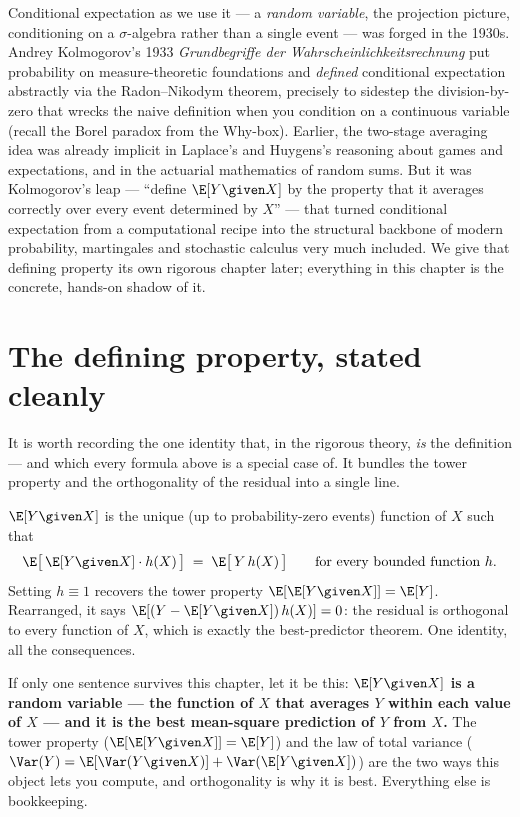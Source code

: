 \begin{historybox}
Conditional expectation as we use it --- a \emph{random variable}, the projection picture, conditioning
on a $\sigma$-algebra rather than a single event --- was forged in the 1930s. Andrey Kolmogorov's 1933
\emph{Grundbegriffe der Wahrscheinlichkeitsrechnung} put probability on measure-theoretic foundations
and \emph{defined} conditional expectation abstractly via the Radon--Nikodym theorem, precisely to
sidestep the division-by-zero that wrecks the naive definition when you condition on a continuous
variable (recall the Borel paradox from the Why-box). Earlier, the two-stage averaging idea was already
implicit in Laplace's and Huygens's reasoning about games and expectations, and in the actuarial
mathematics of random sums. But it was Kolmogorov's leap --- ``define $\E[Y\given X]$ by the property
that it averages correctly over every event determined by $X$'' --- that turned conditional expectation
from a computational recipe into the structural backbone of modern probability, martingales and
stochastic calculus very much included. We give that defining property its own rigorous chapter later;
everything in this chapter is the concrete, hands-on shadow of it.
\end{historybox}

\section{The defining property, stated cleanly}
\label{ch15:defining-property}

It is worth recording the one identity that, in the rigorous theory, \emph{is} the definition --- and
which every formula above is a special case of. It bundles the tower property and the orthogonality of
the residual into a single line.

\begin{formalbox}
$\E[Y\given X]$ is the unique (up to probability-zero events) function of $X$ such that
\[
  \E\big[\,\E[Y\given X]\cdot h(X)\,\big] \;=\; \E\big[\,Y\, h(X)\,\big]
  \qquad \text{for every bounded function } h.
\]
Setting $h \equiv 1$ recovers the tower property $\E[\E[Y\given X]] = \E[Y]$. Rearranged, it says
$\E[(Y - \E[Y\given X])\,h(X)] = 0$: the residual is orthogonal to every function of $X$, which is
exactly the best-predictor theorem. One identity, all the consequences.
\end{formalbox}

\begin{recoverybox}
If only one sentence survives this chapter, let it be this: \textbf{$\E[Y\given X]$ is a random
variable --- the function of $X$ that averages $Y$ within each value of $X$ --- and it is the best
mean-square prediction of $Y$ from $X$.} The tower property ($\E[\E[Y\given X]] = \E[Y]$) and the law of
total variance ($\Var(Y) = \E[\Var(Y\given X)] + \Var(\E[Y\given X])$) are the two ways this object lets
you compute, and orthogonality is why it is best. Everything else is bookkeeping.
\end{recoverybox}

